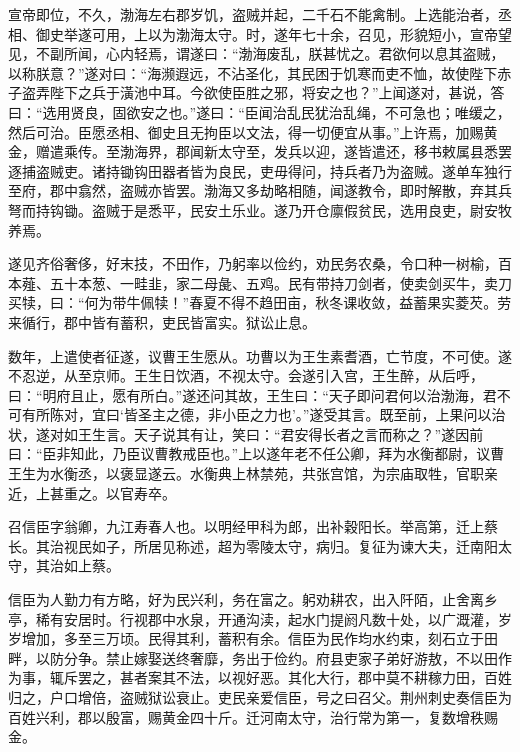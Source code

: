 \documentclass[12pt,UTF8]{ctexbook}
\begin{document}
宣帝即位，不久，渤海左右郡岁饥，盗贼并起，二千石不能禽制。上选能治者，丞相、御史举遂可用，上以为渤海太守。时，遂年七十余，召见，形貌短小，宣帝望见，不副所闻，心内轻焉，谓遂曰：“渤海废乱，朕甚忧之。君欲何以息其盗贼，以称朕意？”遂对曰：“海濒遐远，不沾圣化，其民困于饥寒而吏不恤，故使陛下赤子盗弄陛下之兵于潢池中耳。今欲使臣胜之邪，将安之也？”上闻遂对，甚说，答曰：“选用贤良，固欲安之也。”遂曰：“臣闻治乱民犹治乱绳，不可急也；唯缓之，然后可治。臣愿丞相、御史且无拘臣以文法，得一切便宜从事。”上许焉，加赐黄金，赠遣乘传。至渤海界，郡闻新太守至，发兵以迎，遂皆遣还，移书敕属县悉罢逐捕盗贼吏。诸持锄钩田器者皆为良民，吏毋得问，持兵者乃为盗贼。遂单车独行至府，郡中翕然，盗贼亦皆罢。渤海又多劫略相随，闻遂教令，即时解散，弃其兵弩而持钩锄。盗贼于是悉平，民安土乐业。遂乃开仓廪假贫民，选用良吏，尉安牧养焉。



遂见齐俗奢侈，好末技，不田作，乃躬率以俭约，劝民务农桑，令口种一树榆，百本薤、五十本葱、一畦韭，家二母彘、五鸡。民有带持刀剑者，使卖剑买牛，卖刀买犊，曰：“何为带牛佩犊！”春夏不得不趋田亩，秋冬课收敛，益蓄果实菱芡。劳来循行，郡中皆有蓄积，吏民皆富实。狱讼止息。



数年，上遣使者征遂，议曹王生愿从。功曹以为王生素耆酒，亡节度，不可使。遂不忍逆，从至京师。王生日饮酒，不视太守。会遂引入宫，王生醉，从后呼，曰：“明府且止，愿有所白。”遂还问其故，王生曰：“天子即问君何以治渤海，君不可有所陈对，宜曰‘皆圣主之德，非小臣之力也’。”遂受其言。既至前，上果问以治状，遂对如王生言。天子说其有让，笑曰：“君安得长者之言而称之？”遂因前曰：“臣非知此，乃臣议曹教戒臣也。”上以遂年老不任公卿，拜为水衡都尉，议曹王生为水衡丞，以褒显遂云。水衡典上林禁苑，共张宫馆，为宗庙取牲，官职亲近，上甚重之。以官寿卒。



召信臣字翁卿，九江寿春人也。以明经甲科为郎，出补穀阳长。举高第，迁上蔡长。其治视民如子，所居见称述，超为零陵太守，病归。复征为谏大夫，迁南阳太守，其治如上蔡。



信臣为人勤力有方略，好为民兴利，务在富之。躬劝耕农，出入阡陌，止舍离乡亭，稀有安居时。行视郡中水泉，开通沟渎，起水门提阏凡数十处，以广溉灌，岁岁增加，多至三万顷。民得其利，蓄积有余。信臣为民作均水约束，刻石立于田畔，以防分争。禁止嫁娶送终奢靡，务出于俭约。府县吏家子弟好游敖，不以田作为事，辄斥罢之，甚者案其不法，以视好恶。其化大行，郡中莫不耕稼力田，百姓归之，户口增倍，盗贼狱讼衰止。吏民亲爱信臣，号之曰召父。荆州刺史奏信臣为百姓兴利，郡以殷富，赐黄金四十斤。迁河南太守，治行常为第一，复数增秩赐金。
\end{document}
